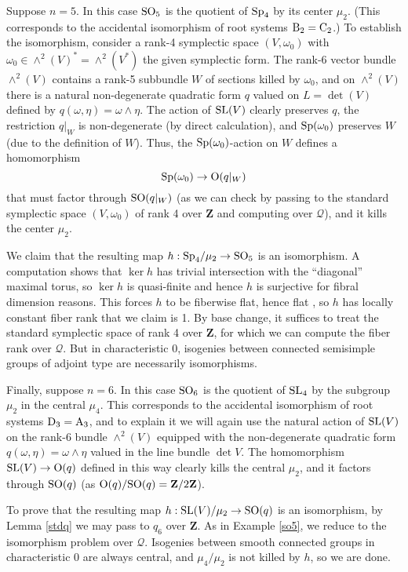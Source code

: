 \documentclass[10pt]{article}
\newcommand{\Q}{\mathscr{Q}}
\renewcommand{\(}{\left(}
\renewcommand{\)}{\right)}
\numberwithin{thm}{subsection}
\begin{document}
\begin{ex}\label{so5}
Suppose $n = 5$. In this case
${\rm{SO}}_5$ is the quotient of
${\rm{Sp}}_4$ by its center $\mu_2$. 
(This corresponds to the accidental isomorphism of root systems
${\rm{B}}_2 = {\rm{C}}_2$.)  To establish the isomorphism, consider a rank-4 symplectic space $(V,\omega_0)$
with $\omega_0 \in \wedge^2(V)^{\ast} = \wedge^2(V^{\ast})$ the given
symplectic form.  The rank-6 vector bundle
$\wedge^2(V)$ contains a rank-5 subbundle $W$ of sections
killed by $\omega_0$, and on $\wedge^2(V)$ there is a natural
non-degenerate quadratic form $q$ valued on $L = \det(V)$ defined
by $q(\omega, \eta) = \omega \wedge \eta$.  The action of
${\rm{SL}}(V)$ clearly preserves $q$, the restriction
$q|_W$ is non-degenerate (by direct calculation), and ${\rm{Sp}}(\omega_0)$
preserves $W$ (due to the definition of $W$).  
Thus, the ${\rm{Sp}}(\omega_0)$-action on $W$ defines a homomorphism
$${\rm{Sp}}(\omega_0) \rightarrow {\rm{O}}(q|_W)$$
that must factor through ${\rm{SO}}(q|_W)$ (as we can check by passing to the standard symplectic space
$(V,\omega_0)$ of rank 4 over ${\mathbf{Z}}$ and computing over $\Q$), and it kills
the center $\mu_2$.

We claim that the resulting map $h:{\rm{Sp}}_4/\mu_2 \rightarrow {\rm{SO}}_5$ is
an isomorphism.  A computation shows 
that $\ker h$ has trivial intersection with the ``diagonal'' maximal torus, so $\ker h$ is quasi-finite
and hence $h$ is surjective for fibral dimension reasons.  This forces $h$
to be fiberwise flat, hence flat \cite[IV$_3$, 11.3.10]{ega}, 
so $h$ has locally constant fiber rank that we claim is 1.
By base change, it suffices to treat the standard symplectic space of rank 4 over
${\mathbf{Z}}$, for which we can 
compute the fiber rank over $\Q$.  But in characteristic 0, isogenies between connected
semisimple groups of adjoint type are necessarily isomorphisms.
\end{ex}

\begin{ex}\label{so6}
Finally, suppose $n = 6$.  In this case ${\rm{SO}}_6$ is the quotient of
${\rm{SL}}_4$ by the subgroup $\mu_2$ in the central $\mu_4$. 
This corresponds to the accidental isomorphism of root systems
${\rm{D}}_3 = {\rm{A}}_3$, and to explain it we will again use
the natural action of ${\rm{SL}}(V)$ on the rank-6 bundle $\wedge^2(V)$
equipped with the non-degenerate quadratic form $q(\omega,\eta) = \omega \wedge \eta$
valued in the line bundle $\det V$. The
homomorphism ${\rm{SL}}(V) \rightarrow {\rm{O}}(q)$ defined in this way clearly kills the central
$\mu_2$, and it factors 
through ${\rm{SO}}(q)$ (as ${\rm{O}}(q)/{\rm{SO}}(q) = {\mathbf{Z}}/2{\mathbf{Z}}$). 

To prove that the resulting map $h:{\rm{SL}}(V)/\mu_2 \rightarrow {\rm{SO}}(q)$
is an isomorphism, by Lemma \ref{stdq} we may pass to $q_6$ over ${\mathbf{Z}}$.
As in Example \ref{so5}, we reduce to the isomorphism
problem over $\Q$.  Isogenies between smooth connected
groups in characteristic 0 are always central, and $\mu_4/\mu_2$ is not killed
by $h$, so we are done.
\end{ex}
\end{document}
